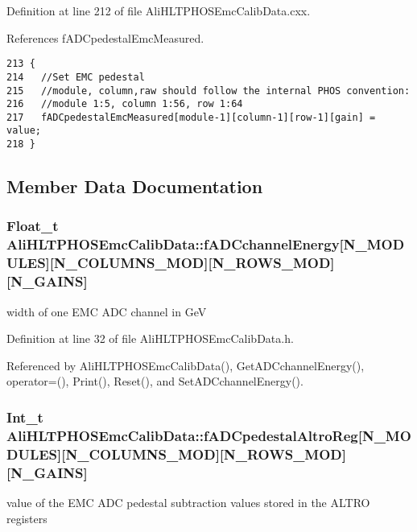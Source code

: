 Definition at line 212 of file Ali\-HLTPHOSEmc\-Calib\-Data.cxx.

References f\-ADCpedestal\-Emc\-Measured.

\footnotesize\begin{verbatim}213 {
214   //Set EMC pedestal
215   //module, column,raw should follow the internal PHOS convention:
216   //module 1:5, column 1:56, row 1:64
217   fADCpedestalEmcMeasured[module-1][column-1][row-1][gain] = value;
218 }
\end{verbatim}\normalsize 




\subsection{Member Data Documentation}
\subsubsection{\setlength{\rightskip}{0pt plus 5cm}Float\_\-t {\bf Ali\-HLTPHOSEmc\-Calib\-Data::f\-ADCchannel\-Energy}[N\_\-MODULES][N\_\-COLUMNS\_\-MOD][N\_\-ROWS\_\-MOD][N\_\-GAINS]\hspace{0.3cm}{\tt  [protected]}}\label{classAliHLTPHOSEmcCalibData_p0}


width of one EMC ADC channel in Ge\-V 

Definition at line 32 of file Ali\-HLTPHOSEmc\-Calib\-Data.h.

Referenced by Ali\-HLTPHOSEmc\-Calib\-Data(), Get\-ADCchannel\-Energy(), operator=(), Print(), Reset(), and Set\-ADCchannel\-Energy().
\subsubsection{\setlength{\rightskip}{0pt plus 5cm}Int\_\-t {\bf Ali\-HLTPHOSEmc\-Calib\-Data::f\-ADCpedestal\-Altro\-Reg}[N\_\-MODULES][N\_\-COLUMNS\_\-MOD][N\_\-ROWS\_\-MOD][N\_\-GAINS]\hspace{0.3cm}{\tt  [protected]}}\label{classAliHLTPHOSEmcCalibData_p2}


value of the EMC ADC pedestal subtraction values stored in the ALTRO registers 

